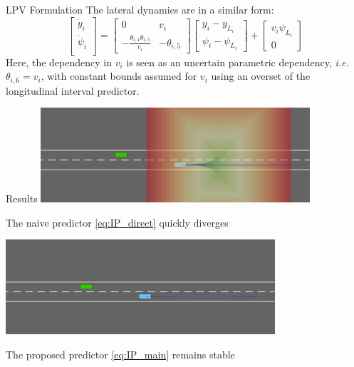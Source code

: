 \documentclass[slideopt,A4,showboxes,svgnames]{beamer}
\begin{document}
\begin{frame}{LPV Formulation}
The lateral dynamics are in a similar form:
\begin{equation*}
\begin{bmatrix}
\dot{y}_i \\
\dot{\psi}_i \\
\end{bmatrix}
=
\begin{bmatrix}
0 & v_i \\
-\frac{\theta_{i,4} \theta_{i,5}}{v_i} & -\theta_{i,5}
\end{bmatrix}
\begin{bmatrix}
y_i - y_{L_i} \\
\psi_i - \psi_{L_i}
\end{bmatrix}
+
\begin{bmatrix}
v_i\psi_{L_i} \\
0
\end{bmatrix}
\end{equation*}
Here, the dependency in $v_i$ is seen as an uncertain parametric dependency, \emph{i.e.} $\theta_{i,6}=v_i$, with constant bounds assumed for $v_i$ using an overset of the longitudinal interval predictor.
\end{frame}

\begin{frame}{Results}
\centering
\vspace*{\baselineskip}
\includegraphics[width=0.75\textwidth]{../img/driving_observer.png}

The naive predictor \eqref{eq:IP_direct} quickly diverges

\includegraphics[width=0.75\textwidth]{../img/driving_predictor.png}

The proposed predictor \eqref{eq:IP_main} remains stable
\end{frame}
\end{document}
